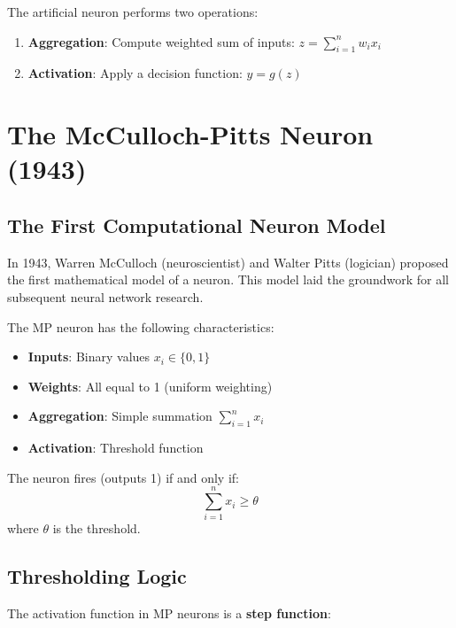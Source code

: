 The artificial neuron performs two operations:
\begin{enumerate}
    \item \textbf{Aggregation}: Compute weighted sum of inputs: $z = \sum_{i=1}^{n} w_i x_i$
    \item \textbf{Activation}: Apply a decision function: $y = g(z)$
\end{enumerate}


\section{The McCulloch-Pitts Neuron (1943)}

\subsection{The First Computational Neuron Model}

In 1943, Warren McCulloch (neuroscientist) and Walter Pitts (logician) proposed the first mathematical model of a neuron. This model laid the groundwork for all subsequent neural network research.

\begin{definitionbox}
The MP neuron has the following characteristics:
\begin{itemize}
    \item \textbf{Inputs}: Binary values $x_i \in \{0, 1\}$
    \item \textbf{Weights}: All equal to 1 (uniform weighting)
    \item \textbf{Aggregation}: Simple summation $\sum_{i=1}^{n} x_i$
    \item \textbf{Activation}: Threshold function
\end{itemize}

The neuron fires (outputs 1) if and only if:
\[
\sum_{i=1}^{n} x_i \geq \theta
\]
where $\theta$ is the threshold.
\end{definitionbox}

\subsection{Thresholding Logic}

The activation function in MP neurons is a \textbf{step function}:

